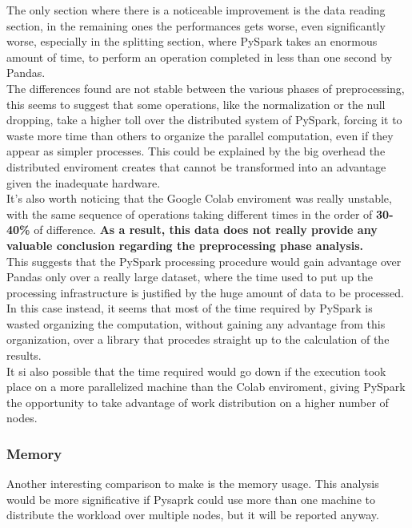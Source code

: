 \documentclass[
	letterpaper, %
	10pt, %
]{class}
\begin{document}
The only section where there is a noticeable improvement is the data reading section, in the remaining ones the performances gets worse, even significantly worse, especially in the splitting section, where PySpark takes an enormous amount of time, to perform
an operation completed in less than one second by Pandas.\\

The differences found are not stable between the various phases of preprocessing, this seems to suggest that some operations, like the normalization or the null dropping, take a higher toll over the distributed system of PySpark,
forcing it to waste more time than others to organize the parallel computation, even if they appear as simpler processes.
This could be explained by the big overhead the distributed enviroment creates that cannot be transformed into an advantage given the inadequate hardware.\\

It's also worth noticing that the Google Colab enviroment was really unstable, with the same sequence of operations taking different times in the order of \textbf{30-40\%} of difference.
\textbf{As a result, this data does not really provide any valuable conclusion regarding the preprocessing phase analysis.}\\

This suggests that the PySpark processing procedure would gain advantage over Pandas only over a really large dataset, where the time used to put up the processing infrastructure is justified by the huge amount of data to be processed.
In this case instead, it seems that most of the time required by PySpark is wasted organizing the computation, without gaining any advantage from this organization, over a library that procedes straight up to the calculation of the results.\\

It si also possible that the time required would go down if the execution took place on a more parallelized machine than the Colab enviroment, giving PySpark the opportunity to take advantage of work distribution on a higher number of nodes.
\subsubsection{Memory}

Another interesting comparison to make is the memory usage. This analysis would be more significative if Pysaprk could use more than one machine to distribute the workload over multiple nodes, but it will be reported anyway.
\end{document}
